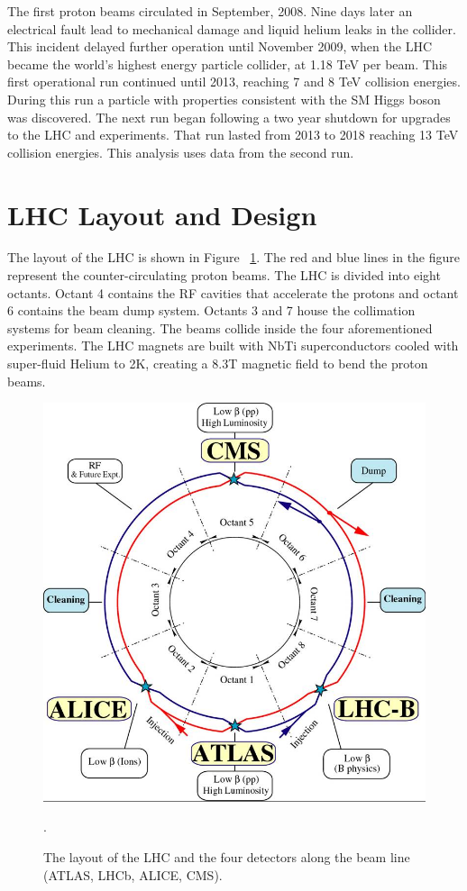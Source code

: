 The first proton beams circulated in September, 2008. Nine days later an electrical fault lead to mechanical damage and liquid helium leaks in the collider. This incident delayed further operation until November 2009, when the LHC became the world's highest energy particle collider, at 1.18 TeV per beam. This first operational run continued until 2013, reaching 7 and 8 TeV collision energies. During this run a particle with properties consistent with the SM Higgs boson was discovered. The next run began following a two year shutdown for upgrades to the LHC and experiments. That run lasted from 2013 to 2018 reaching 13 TeV collision energies. This analysis uses data from the second run. 
\section{LHC Layout and Design}
The layout of the LHC is shown in Figure ~\ref{fig:lhc_layout}. The red and blue lines in the figure represent the counter-circulating proton beams. The LHC is divided into eight octants.  Octant 4 contains the RF cavities that accelerate the protons and octant 6 contains the beam dump system. Octants 3 and 7 house the collimation systems for beam cleaning. The beams collide inside the four aforementioned experiments. The LHC magnets are built with NbTi superconductors cooled with super-fluid Helium to 2K, creating a 8.3T magnetic field to bend the proton beams.


\begin{figure}[h!]
  \centering
  \includegraphics[width=\hsize]{figures/Detector/lhc.jpg}
  \caption{The layout of the LHC and the four detectors along the beam line (ATLAS, LHCb, ALICE, CMS).}. 
  \label{fig:lhc_layout}
\end{figure}
\FloatBarrier


